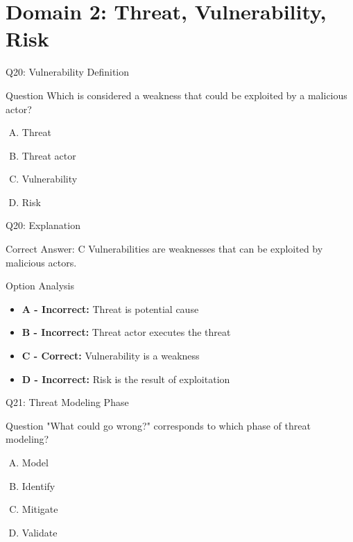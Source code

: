 \documentclass{beamer}
\begin{document}
	\section{Domain 2: Threat, Vulnerability, Risk}
	
	\begin{frame}{Q20: Vulnerability Definition}
		\begin{block}{Question}
			Which is considered a weakness that could be exploited by a malicious actor?
		\end{block}
		\begin{enumerate}[(A)]
			\item Threat
			\item Threat actor
			\item Vulnerability
			\item Risk
		\end{enumerate}
	\end{frame}
	
	\begin{frame}{Q20: Explanation}
		\begin{block}{Correct Answer: C}
			Vulnerabilities are weaknesses that can be exploited by malicious actors.
		\end{block}
		\begin{block}{Option Analysis}
			\begin{itemize}
				\item \textbf{A - Incorrect:} Threat is potential cause
				\item \textbf{B - Incorrect:} Threat actor executes the threat
				\item \textbf{C - Correct:} Vulnerability is a weakness
				\item \textbf{D - Incorrect:} Risk is the result of exploitation
			\end{itemize}
		\end{block}
	\end{frame}
	
	\begin{frame}{Q21: Threat Modeling Phase}
		\begin{block}{Question}
			"What could go wrong?" corresponds to which phase of threat modeling?
		\end{block}
		\begin{enumerate}[(A)]
			\item Model
			\item Identify
			\item Mitigate
			\item Validate
		\end{enumerate}
	\end{frame}
	
\end{document}
